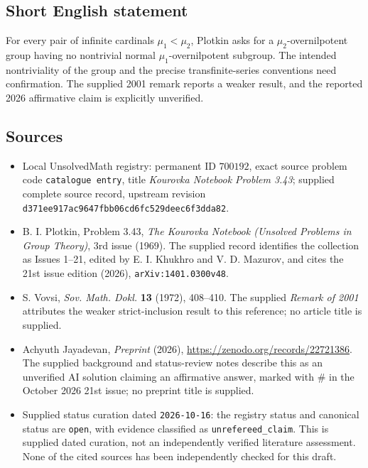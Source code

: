 \documentclass[11pt]{article}
\begin{document}
\subsection{Short English statement}
For every pair of infinite cardinals \(\mu_1<\mu_2\), Plotkin asks for a \(\mu_2\)-overnilpotent group having no nontrivial normal \(\mu_1\)-overnilpotent subgroup. The intended nontriviality of the group and the precise transfinite-series conventions need confirmation. The supplied 2001 remark reports a weaker result, and the reported 2026 affirmative claim is explicitly unverified.
\subsection{Sources}
\begin{itemize}
\item Local UnsolvedMath registry: permanent ID \(700192\), exact source problem code \texttt{catalogue entry}, title \emph{Kourovka Notebook Problem 3.43}; supplied complete source record, upstream revision \texttt{d371ee917ac9647fbb06cd6fc529deec6f3dda82}.
\item B. I. Plotkin, Problem 3.43, \emph{The Kourovka Notebook (Unsolved Problems in Group Theory)}, 3rd issue (1969). The supplied record identifies the collection as Issues 1--21, edited by E. I. Khukhro and V. D. Mazurov, and cites the 21st issue edition (2026), \texttt{arXiv:1401.0300v48}.
\item S. Vovsi, \emph{Sov. Math. Dokl.} \textbf{13} (1972), 408--410. The supplied \emph{Remark of 2001} attributes the weaker strict-inclusion result to this reference; no article title is supplied.
\item Achyuth Jayadevan, \emph{Preprint} (2026), \url{https://zenodo.org/records/22721386}. The supplied background and status-review notes describe this as an unverified AI solution claiming an affirmative answer, marked with \(\#\) in the October 2026 21st issue; no preprint title is supplied.
\item Supplied status curation dated \texttt{2026-10-16}: the registry status and canonical status are \texttt{open}, with evidence classified as \texttt{unrefereed\_claim}. This is supplied dated curation, not an independently verified literature assessment. None of the cited sources has been independently checked for this draft.
\end{itemize}
\end{document}
